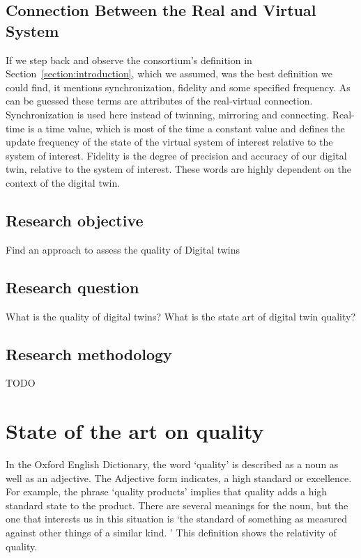 \documentclass[9pt,conference]{IEEEtran}
\begin{document}
    \subsection*{Connection Between the Real and Virtual System}
    If we step back and observe the consortium's definition in Section~\ref{section:introduction}, which we assumed, was the best definition we could find, 
    it mentions synchronization, fidelity and some specified frequency. As can be guessed these terms are attributes of the real-virtual connection.
    Synchronization is used here instead of twinning, mirroring and connecting. 
    Real-time is a time value, which is most of the time a constant value and defines the update frequency of the state of the virtual system of interest relative to the system of interest.
    Fidelity is the degree of precision and accuracy of our digital twin, relative to the system of interest.
    These words are highly dependent on the context of the digital twin.
    \subsection{Research objective}
    Find an approach to assess the quality of Digital twins~\cite{Jones2020}

    \subsection{Research question}\label{section: Research Questions}
    What is the quality of digital twins?
    What is the state art of digital twin quality?

    \subsection{Research methodology}
    TODO

    \section{State of the art on quality}
    In the Oxford English Dictionary, the word `quality' is described as a noun as well as an adjective. The Adjective form indicates, a high standard or excellence. 
    For example, the phrase `quality products' implies that quality adds a high standard state to the product. 
    There are several meanings for the noun, but the one that interests us in this situation is `the standard of something as measured against other things of a similar kind. \cite{OxfordDictionary}'
    This definition shows the relativity of quality.
\end{document}
